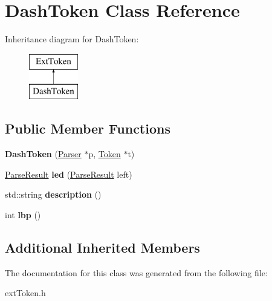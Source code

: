 \hypertarget{class_dash_token}{}\section{Dash\+Token Class Reference}
\label{class_dash_token}
Inheritance diagram for Dash\+Token\+:\begin{figure}[H]
\begin{center}
\leavevmode
\includegraphics[height=2.000000cm]{class_dash_token}
\end{center}
\end{figure}
\subsection*{Public Member Functions}
\begin{DoxyCompactItemize}
\item 
\hypertarget{class_dash_token_a9570d66563405c728e679b63a44e53e2}{}{\bfseries Dash\+Token} (\hyperlink{class_parser}{Parser} $\ast$p, \hyperlink{class_token}{Token} $\ast$t)\label{class_dash_token_a9570d66563405c728e679b63a44e53e2}

\item 
\hypertarget{class_dash_token_a703ca6afcd05ac4688c66b82e177bdbc}{}\hyperlink{class_parse_result}{Parse\+Result} {\bfseries led} (\hyperlink{class_parse_result}{Parse\+Result} left)\label{class_dash_token_a703ca6afcd05ac4688c66b82e177bdbc}

\item 
\hypertarget{class_dash_token_a02d79abb30dcab20081edb8e969885d2}{}std\+::string {\bfseries description} ()\label{class_dash_token_a02d79abb30dcab20081edb8e969885d2}

\item 
\hypertarget{class_dash_token_a1cf877584a85c06e884a182744e92b39}{}int {\bfseries lbp} ()\label{class_dash_token_a1cf877584a85c06e884a182744e92b39}

\end{DoxyCompactItemize}
\subsection*{Additional Inherited Members}


The documentation for this class was generated from the following file\+:\begin{DoxyCompactItemize}
\item 
ext\+Token.\+h\end{DoxyCompactItemize}

